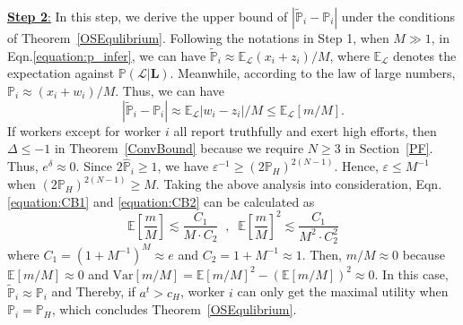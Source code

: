 \underline{\textbf{Step 2}:} In this step, we derive the upper bound of $|\tilde{\mathbb{P}}_i-\mathbb{P}_i|$ under the conditions of Theorem~\ref{OSEqulibrium}. Following the notations in Step 1, when $M\gg 1$, in Eqn.\ref{equation:p_infer}, we can have $\tilde{\mathbb{P}}_i\approx \mathbb{E}_{\mathcal{L}}(x_i+z_i)/M$, where $\mathbb{E}_{\mathcal{L}}$ denotes the expectation against $\mathbb{P}(\mathcal{L}|\bm{L})$. Meanwhile, according to the law of large numbers, $\mathbb{P}_i\approx (x_i+w_i)/M$. Thus, we can have
\begin{equation}
|\tilde{\mathbb{P}}_i-\mathbb{P}_i|\approx \mathbb{E}_{\mathcal{L}}|w_i-z_i|/M\leq \mathbb{E}_{\mathcal{L}}\left[m/M\right].
\end{equation}
If workers except for worker $i$ all report truthfully and exert high efforts, then $\Delta \leq -1$ in Theorem~\ref{ConvBound} because we require $N\geq 3$ in Section~\ref{PF}.
Thus, $e^{\delta}\approx 0$.
Since $2\hat{\mathbb{P}}_i\geq 1$, we have $\varepsilon^{-1}\geq (2\mathbb{P}_H)^{2(N-1)}$.
Hence, $\varepsilon\leq M^{-1}$ when $(2\mathbb{P}_H)^{2(N-1)} \geq M$.
Taking the above analysis into consideration, Eqn.\ref{equation:CB1} and \ref{equation:CB2} can be calculated as
\begin{equation}
\mathbb{E}\left[\frac{m}{M}\right]\lesssim \frac{C_{1}}{M\cdot C_2}\;\;, \;\;\mathbb{E}\left[\frac{m}{M}\right]^2\lesssim \frac{C_{1}}{M^2\cdot C_2^2}
\end{equation}
where $C_{1}=(1+M^{-1})^{M}\approx e$ and $C_{2}=1+M^{-1}\approx 1$.
Then, $m/M\approx 0$ because $\mathbb{E}[m/M]\approx 0$ and $\mathrm{Var}[m/M]=\mathbb{E}[m/M]^2-(\mathbb{E}[m/M])^2 \approx 0$.
In this case, $\tilde{\mathbb{P}}_i\approx \mathbb{P}_i$ and 
Thereby, if $a^t>c_H$, worker $i$ can only get the maximal utility when $\mathbb{P}_i=\mathbb{P}_H$, which concludes Theorem~\ref{OSEqulibrium}.

